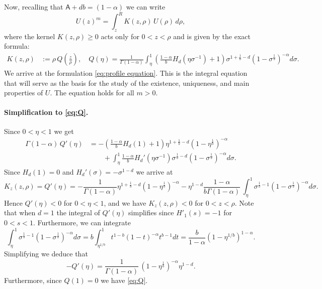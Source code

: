 \documentclass[a4paper]{article}
\theoremstyle{definition}
\begin{document}
%
%
Now, recalling that $\mathsf A+d b = (1-\alpha)$ we can write
\begin{equation*}
  U(z)^{m} = \int_z^R K(z,\rho)\, U(\rho) \,d\rho,
\end{equation*}
where the kernel $K(z,\rho)\ge 0$ acts only for $0<z<\rho$ and is given by the exact formula:
\begin{align*}
  K(z,\rho) & := \rho\, Q\left(\tfrac z \rho\right),
  \quad
  Q(\eta) =
  \frac{1}{\Gamma(1-\alpha)} \int_{\eta}^1 \left(\frac{1-\alpha}{b} H_d\left(\eta \sigma^{-1} \right) + 1 \right) \sigma^{1 + \frac{1}{b}-d} \left(1-\sigma^\frac{1}{b}\right)^{-\alpha} d\sigma.
\end{align*}
We arrive at the formulation \eqref{eq:profile equation}.
This is the integral equation that will serve as the basis for the study of the existence, uniqueness, and main properties of $U$.
The equation holds for all $m > 0$.

\paragraph{Simplification to \eqref{eq:Q}.}
Since $0<\eta<1$ we get
\begin{align*}
  \Gamma(1-\alpha) \,  Q'(\eta)
  & = -\left(\frac{1-\alpha}{b} H_d\left(1 \right) + 1 \right) \eta^{1 + \frac{1}{b}-d} \left(1-\eta^\frac{1}{b}\right)^{-\alpha}
  \\
  & \qquad +\int_{\eta}^1 \frac{1-\alpha}{b} H_d'\left(\eta \sigma^{-1} \right) \sigma^{\frac{1}{b}-d} \left(1-\sigma^\frac{1}{b}\right)^{-\alpha} d\sigma.
\end{align*}
Since $H_d(1) = 0$ and $H_d'(\sigma) = -\sigma^{1-d}$  we arrive at
\begin{equation*}
  K_z(z,\rho)=
  Q'(\eta) =
  -\frac{1}{\Gamma(1-\alpha)} \eta^{1 + \frac{1}{b}-d} \left(1-\eta^\frac{1}{b}\right)^{-\alpha}
  -\eta^{1-d}\frac{1-\alpha}{b\Gamma(1-\alpha)} \, \int_{\eta}^1 \sigma^{ \frac{1}{b}-1} \left(1-\sigma^\frac{1}{b}\right)^{-\alpha} d\sigma.
\end{equation*}
Hence $Q'(\eta) < 0$ for $0<\eta<1$, and we have $K_z(z,\rho)<0$ for $0<z<\rho$. Note that when $d=1$ the integral of $Q'(\eta)$ simplifies since $H'_1(s)=-1$ for $0<s<1$.
Furthermore, we can integrate
$$
\int_{\eta}^1   \sigma^{ \frac{1}{b}-1} \left(1-\sigma^\frac{1}{b}\right)^{-\alpha} d\sigma=
b \int_{\eta^{1/b}}^1   t^{1-b} (1-t)^{-\alpha} t^{b-1} dt = \frac{b}{1-\alpha}(1-\eta^{1/b})^{1-\alpha}.
$$
Simplifying we deduce that
\begin{equation}
  \label{eq:Q'}
  -Q'(\eta) =
  \frac{1}{\Gamma(1-\alpha)}\,(1-\eta^{\frac 1 b})^{-\alpha} \eta^{1-d}.
\end{equation}
Furthermore, since $Q(1) = 0$ we have \eqref{eq:Q}.
\end{document}
